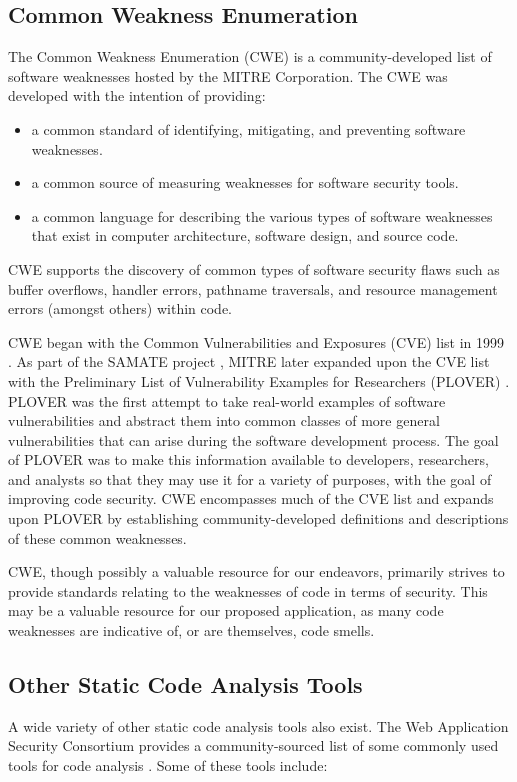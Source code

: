 \documentclass{sig-alternate}
\begin{document}
\subsection{Common Weakness Enumeration}
The Common Weakness Enumeration (CWE) \cite{mitre2006cwe} is a community-developed list of software weaknesses hosted by the MITRE Corporation. The CWE was developed with the intention of providing:

\begin{itemize}
\item a common standard of identifying, mitigating, and preventing software weaknesses.
\item a common source of measuring weaknesses for software security tools.
\item a common language for describing the various types of software weaknesses that exist in computer architecture, software design, and source code.
\end{itemize}

CWE supports the discovery of common types of software security flaws such as buffer overflows, handler errors, pathname traversals, and resource management errors (amongst others) within code.

CWE began with the Common Vulnerabilities and Exposures (CVE) list in 1999 \cite{mitre2005cve}. As part of the SAMATE project \cite{nist2005samate}, MITRE later expanded upon the CVE list with the Preliminary List of Vulnerability Examples for Researchers (PLOVER) \cite{christey2005plover}. PLOVER was the first attempt to take real-world examples of software vulnerabilities and abstract them into common classes of more general vulnerabilities that can arise during the software development process. The goal of PLOVER was to make this information available to developers, researchers, and analysts so that they may use it for a variety of purposes, with the goal of improving code security. CWE encompasses much of the CVE list and expands upon PLOVER by establishing community-developed definitions and descriptions of these common weaknesses.

CWE, though possibly a valuable resource for our endeavors, primarily strives to provide standards relating to the weaknesses of code in terms of security. This may be a valuable resource for our proposed application, as many code weaknesses are indicative of, or are themselves, code smells.

\subsection{Other Static Code Analysis Tools}
A wide variety of other static code analysis tools also exist. The Web Application Security Consortium provides a community-sourced list of some commonly used tools for code analysis \cite{webappsec2012}. Some of these tools include:
\end{document}
